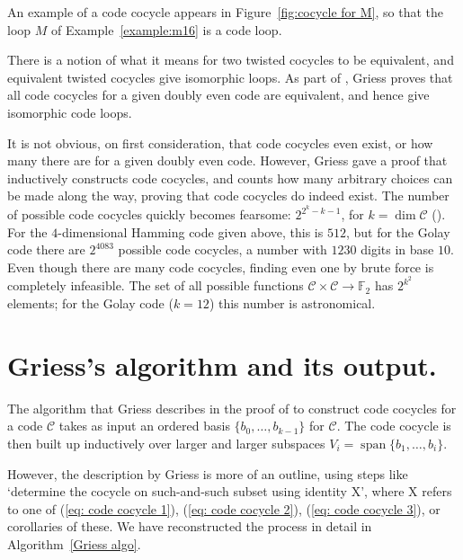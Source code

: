\documentclass{article}
\theoremstyle{plain}
\theoremstyle{definition}
\def \cC {\mathcal{C}}
\def \FF {\mathbb{F}}
\DeclareMathOperator{\Span}{span}
\begin{document}
An example of a code cocycle appears in Figure~\ref{fig:cocycle for M}, so that the loop $M$ of Example~\ref{example:m16} is a code loop.

There is a notion of what it means for two twisted cocycles to be equivalent, and equivalent twisted cocycles give isomorphic loops.
As part of \cite[Theorem 10]{Griess}, Griess proves that all code cocycles for a given doubly even code are equivalent, and hence give isomorphic code loops. 

It is not obvious, on first consideration, that code cocycles even exist, or how many there are for a given doubly even code. 
However, Griess gave a proof that inductively constructs code cocycles, and counts how many arbitrary choices can be made along the way, proving that code cocycles do indeed exist.
The number of possible code cocycles quickly becomes fearsome: $2^{2^k-k-1}$, for $k=\dim \cC$ (\cite[Theorem 10]{Griess}).
For the $4$-dimensional Hamming code given above, this is $512$, but for the Golay code there are $2^{4083}$ possible code cocycles, a number with $1230$ digits in base $10$.
Even though there are many code cocycles, finding even one by brute force is completely infeasible.
The set of all possible functions $\cC\times \cC \to \FF_2$ has $2^{k^2}$ elements; for the Golay code ($k=12$) this number is astronomical.




\section{Griess's algorithm and its output.}

The algorithm that Griess describes in the proof of \cite[Theorem 10]{Griess} to construct code cocycles for a code $\cC$ takes as input an ordered  basis $\{b_0,\ldots,b_{k-1}\}$ for $\cC$. 
The code cocycle is then built up inductively over larger and larger subspaces $V_i = \Span\{b_1,\ldots,b_i\}$.%

However, the description by Griess is more of an outline, using steps like `determine the cocycle on such-and-such subset using identity X', where X refers to one of (\ref{eq: code cocycle 1}), (\ref{eq: code cocycle 2}), (\ref{eq: code cocycle 3}), or corollaries of these. We have reconstructed the process in detail in Algorithm~\ref{Griess algo}.
\end{document}

